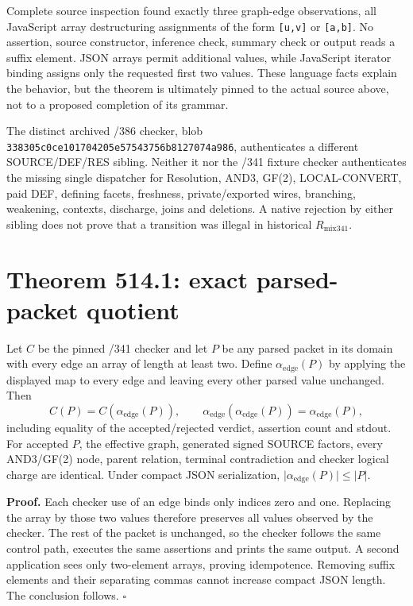 \documentclass[11pt]{article}
\newcommand{\Rmix}{R_{\mathrm{mix341}}}
\newcommand{\Aedge}{\alpha_{\mathrm{edge}}}
\begin{document}
Complete source inspection found exactly three graph-edge observations, all JavaScript array
destructuring assignments of the form \texttt{[u,v]} or \texttt{[a,b]}.  No assertion, source
constructor, inference check, summary check or output reads a suffix element.  JSON arrays permit
additional values, while JavaScript iterator binding assigns only the requested first two values.
These language facts explain the behavior, but the theorem is ultimately pinned to the actual source
above, not to a proposed completion of its grammar.

The distinct archived /386 checker, blob
\texttt{338305c0ce101704205e57543756b8127074a986}, authenticates a different SOURCE/DEF/RES
sibling.  Neither it nor the /341 fixture checker authenticates the missing single dispatcher for
Resolution, AND3, GF(2), LOCAL-CONVERT, paid DEF, defining facets, freshness, private/exported wires,
branching, weakening, contexts, discharge, joins and deletions.  A native rejection by either sibling
does not prove that a transition was illegal in historical \(\Rmix\).

\section*{Theorem 514.1: exact parsed-packet quotient}

Let \(C\) be the pinned /341 checker and let \(P\) be any parsed packet in its domain with every
edge an array of length at least two.  Define \(\Aedge(P)\) by applying the displayed map to every
edge and leaving every other parsed value unchanged.  Then
\[
  C(P)=C(\Aedge(P)),\qquad
  \Aedge(\Aedge(P))=\Aedge(P),
\]
including equality of the accepted/rejected verdict, assertion count and stdout.  For accepted
\(P\), the effective graph, generated signed SOURCE factors, every AND3/GF(2) node, parent relation,
terminal contradiction and checker logical charge are identical.  Under compact JSON serialization,
\(\lvert\Aedge(P)\rvert\leq\lvert P\rvert\).

\textbf{Proof.}  Each checker use of an edge binds only indices zero and one.  Replacing the array by
those two values therefore preserves all values observed by the checker.  The rest of the packet is
unchanged, so the checker follows the same control path, executes the same assertions and prints the
same output.  A second application sees only two-element arrays, proving idempotence.  Removing suffix
elements and their separating commas cannot increase compact JSON length.  The conclusion follows.
\(\square\)
\end{document}
